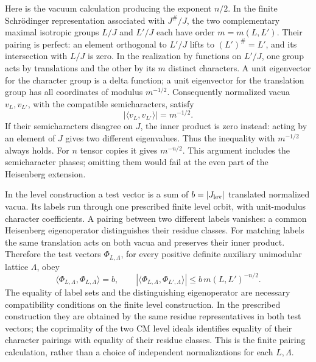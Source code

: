 Here is the vacuum calculation producing the exponent \(n/2\).
In the finite Schr\"odinger representation associated with
\(J^\#/J\), the two complementary maximal isotropic groups
\(L/J\) and \(L'/J\) each have order \(m=m(L,L')\).
Their pairing is perfect: an element orthogonal to \(L'/J\)
lifts to \((L')^\#=L'\), and its intersection with \(L/J\) is zero.
In the realization by functions on \(L'/J\), one group acts by
translations and the other by its \(m\) distinct characters.
A unit eigenvector for the character group is a delta function;
a unit eigenvector for the translation group has all coordinates
of modulus \(m^{-1/2}\).
Consequently normalized vacua \(v_L,v_{L'}\), with the compatible
semicharacters, satisfy
\[
 |\langle v_L,v_{L'}\rangle|=m^{-1/2}.
\]
If their semicharacters disagree on \(J\), the inner product is
zero instead: acting by an element of \(J\) gives two different
eigenvalues.  Thus the inequality with \(m^{-1/2}\) always holds.
For \(n\) tensor copies it gives \(m^{-n/2}\).
This argument includes the semicharacter phases; omitting them
would fail at the even part of the Heisenberg extension.

In the level construction a test vector is a sum of \(b=|J_{\rm lev}|\)
translated normalized vacua.  Its labels run through one prescribed
finite level orbit, with unit-modulus character coefficients.
A pairing between two different labels vanishes: a common
Heisenberg eigenoperator distinguishes their residue classes.
For matching labels the same translation acts on both vacua and
preserves their inner product.  Therefore the test vectors
\(\Phi_{L,\Lambda}\), for every positive definite auxiliary
unimodular lattice \(\Lambda\), obey
\begin{equation}\label{eq:sr-test-gram}
 \langle\Phi_{L,\Lambda},\Phi_{L,\Lambda}\rangle=b,\qquad
 |\langle\Phi_{L,\Lambda},\Phi_{L',\Lambda}\rangle|
       \le b\,m(L,L')^{-n/2}.
\end{equation}
The equality of label sets and the distinguishing eigenoperator
are necessary compatibility conditions on the finite level
construction.  In the prescribed construction they are obtained
by the same residue representatives in both test vectors; the
coprimality of the two CM level ideals identifies equality of
their character pairings with equality of their residue classes.
This is the finite pairing calculation, rather than a choice of
independent normalizations for each \(L,\Lambda\).

